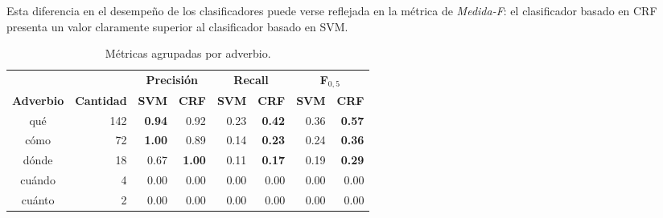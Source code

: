 \documentclass[runningheads,a4paper]{llncs}
\begin{document}
Esta diferencia en el desempeño de los clasificadores puede verse reflejada en la métrica de  \emph{Medida-F}: el clasificador basado en CRF presenta un valor  claramente superior al clasificador basado en SVM.

\begin{table}[ht]
 	\renewcommand{\arraystretch}{1.3}
	\renewcommand{\tabcolsep}{3pt}
	\caption{Métricas agrupadas por adverbio.}
	\label{table:metricas-adv}
	\centering
	\begin{tabular}{c r r r r r r r}
		\hline
		\multicolumn{2}{c}{} 
			& \multicolumn{2}{c}{\textbf{Precisión}} 
			& \multicolumn{2}{c}{\textbf{Recall}} 
			& \multicolumn{2}{c}{\textbf{F$_{0,5}$}} \\
		\multicolumn{1}{c}{\textbf{Adverbio}} & \multicolumn{1}{c}{\textbf{Cantidad}}
			& \multicolumn{1}{r}{\textbf{SVM}} & \multicolumn{1}{r}{\textbf{CRF}}
			& \multicolumn{1}{r}{\textbf{SVM}} & \multicolumn{1}{r}{\textbf{CRF}}
			& \multicolumn{1}{r}{\textbf{SVM}} & \multicolumn{1}{r}{\textbf{CRF}} \\		
		\hline\hline
		qué & 142 & \textbf{0.94} & 0.92 & 0.23 & \textbf{0.42} & 0.36 & \textbf{0.57} \\
		cómo & 72 & \textbf{1.00} & 0.89 & 0.14 & \textbf{0.23} & 0.24 & \textbf{0.36} \\
		dónde & 18 & 0.67 & \textbf{1.00} & 0.11 & \textbf{0.17} & 0.19 & \textbf{0.29} \\
		cuándo & 4 & 0.00 & 0.00 & 0.00 & 0.00 & 0.00 & 0.00 \\
		cuánto & 2 & 0.00 & 0.00 & 0.00 & 0.00 & 0.00 & 0.00 \\
		\hline
	\end{tabular}
\end{table}
\end{document}

